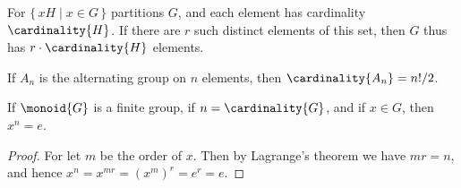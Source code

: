 \documentclass{article}                                                        %
\begin{document}
                \begin{bproof}
                    For $\{\,xH\;|\;x\in{G}\,\}$ partitions $G$, and each
                    element has cardinality $\cardinality{H}$. If there are $r$
                    such distinct elements of this set, then $G$ thus has
                    $r\cdot\cardinality{H}$ elements.
                \end{bproof}
                \begin{theorem}
                    If $A_{n}$ is the alternating group on $n$ elements, then
                    $\cardinality{A_{n}}=n!/2$.
                \end{theorem}
                \begin{theorem}
                    If $\monoid{G}$ is a finite group, if $n=\cardinality{G}$,
                    and if $x\in{G}$, then $x^{n}=e$.
                \end{theorem}
                \begin{proof}
                    For let $m$ be the order of $x$. Then by Lagrange's theorem
                    we have $mr=n$, and hence
                    $x^{n}=x^{mr}=(x^{m})^{r}=e^{r}=e$.
                \end{proof}
\end{document}
